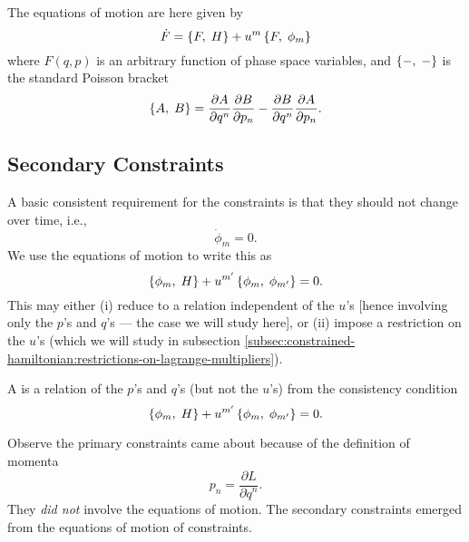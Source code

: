 \label{n:constrained-hamiltonian:poisson-bracket}
The equations of motion are here given by
\begin{equation}
  \dot{F} = \left\{F,\;H\right\} + u^{m}\left\{F,\;\phi_{m}\right\}
\end{equation}
where $F(q,p)$ is an arbitrary function of phase space variables, and
$\left\{-,\;-\right\}$ is the standard Poisson bracket
\begin{equation}
  \left\{A,\;B\right\} =
  \frac{\partial A}{\partial q^{n}}\frac{\partial B}{\partial p_{n}}
- \frac{\partial B}{\partial q^{n}}\frac{\partial A}{\partial p_{n}}.
\end{equation}

\subsection{Secondary Constraints}

A basic consistent requirement for the constraints is that they should
not change over time, i.e.,
\begin{equation}
  \dot{\phi}_{m}=0.
\end{equation}
We use the equations of motion 
to write this as
\begin{equation}
\left\{\phi_{m},\;H\right\} + u^{m'}\left\{\phi_{m},\;\phi_{m'}\right\}=0.
\end{equation}
This may either (i) reduce to a relation independent of the $u$'s [hence
  involving only the $p$'s and $q$'s --- the case we will study here],
or (ii) impose a restriction on the $u$'s (which we will study in
subsection \ref{subsec:constrained-hamiltonian:restrictions-on-lagrange-multipliers}).

\begin{definition}
A  is a relation of the $p$'s and $q$'s
(but not the $u$'s) from the consistency condition
\begin{equation}
\left\{\phi_{m},\;H\right\} + u^{m'}\left\{\phi_{m},\;\phi_{m'}\right\}=0.
\end{equation}
\end{definition}

\M
Observe the primary constraints came about because of the definition of
momenta
\begin{equation}
  p_{n} = \frac{\partial L}{\partial\dot{q}^{n}}.
\end{equation}
They \emph{did not} involve the equations of motion. The secondary
constraints emerged from the equations of motion of constraints.

